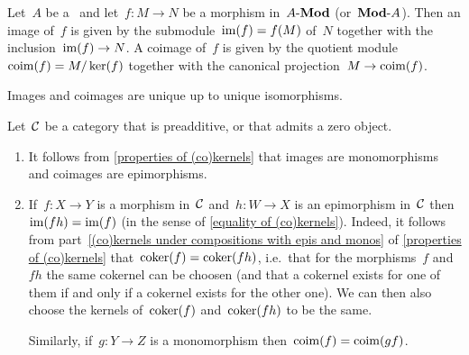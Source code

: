 \begin{example*}
  Let~$A$ be a~{\kalg} and let~$f \colon M \to N$ be a morphism in~$\text{$A$-$\mathbf{Mod}$}$ (or~$\text{$\mathbf{Mod}$-$A$}$).
  Then an image of~$f$ is given by the submodule~$\operatorname{im}(f) = f(M)$ of~$N$ together with the inclusion~$\operatorname{im}(f) \to N$.
  A coimage of~$f$ is given by the quotient module~$\operatorname{coim}(f) = M/\ker(f)$ together with the canonical projection~$M \to \operatorname{coim}(f)$.
\end{example*}


\begin{remarknonum}
  Images and coimages are unique up to unique isomorphisms.
\end{remarknonum}


\begin{remark*}
  \label{(co)images and monos and epis}
  Let~$\mathcal{C}$ be a category that is preadditive, or that admits a zero object.
  \begin{enumerate}
    \item
      It follows from \cref{properties of (co)kernels} that images are monomorphisms and coimages are epimorphisms.
    \item
      If~$f \colon X \to Y$ is a morphism in~$\mathcal{C}$ and~$h \colon W \to X$ is an epimorphism in~$\mathcal{C}$ then~$\operatorname{im}(fh) = \operatorname{im}(f)$ (in the sense of \cref{equality of (co)kernels}).
      Indeed, it follows from part~\ref*{(co)kernels under compositions with epis and monos} of \cref{properties of (co)kernels} that~$\operatorname{coker}(f) = \operatorname{coker}(fh)$, i.e.\ that for the morphisms~$f$ and~$fh$ the same cokernel can be choosen (and that a cokernel exists for one of them if and only if a cokernel exists for the other one).
      We can then also choose the kernels of~$\operatorname{coker}(f)$ and~$\operatorname{coker}(fh)$ to be the same.
      
      Similarly, if~$g \colon Y \to Z$ is a monomorphism then~$\operatorname{coim}(f) = \operatorname{coim}(gf)$.
  \end{enumerate}
\end{remark*}


